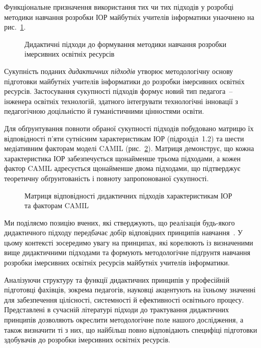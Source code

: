 Функціональне призначення використання тих чи тих підходів у розробці методики навчання розробки ІОР майбутніх учителів інформатики унаочнено на рис.~\ref{fig:2.1}.

\begin{figure}[!h]
\centering

\caption{Дидактичні підходи до формування методики навчання розробки імерсивних освітніх ресурсів}
\label{fig:2.1}
\end{figure}

Сукупність поданих \emph{дидактичних підходів} утворює методологічну основу підготовки майбутніх учителів інформатики до розробки імерсивних освітніх ресурсів. Застосування сукупності підходів формує новий тип педагога~-- інженера освітніх технологій, здатного інтегрувати технологічні інновації з педагогічною доцільністю й гуманістичними цінностями освіти.

Для обґрунтування повноти обраної сукупності підходів побудовано матрицю їх відповідності п'яти сутнісним характеристикам ІОР (підрозділ~1.2) та шести медіативним факторам моделі CAMIL (рис.~\ref{fig:approaches_matrix}). Матриця демонструє, що кожна характеристика ІОР забезпечується щонайменше трьома підходами, а кожен фактор CAMIL адресується щонайменше двома підходами, що підтверджує теоретичну обґрунтованість і повноту запропонованої сукупності.

\begin{figure}[!h]
\centering

\caption{Матриця відповідності дидактичних підходів характеристикам ІОР та факторам CAMIL}
\label{fig:approaches_matrix}
\end{figure}

Ми поділяємо позицію вчених, які стверджують, що реалізація будь-якого дидактичного підходу передбачає добір відповідних принципів навчання~\cite{Dychkivska2012Innovative}. У цьому контексті зосередимо увагу на принципах, які корелюють із визначеними вище дидактичними підходами та формують методологічне підґрунтя навчання розробки імерсивних освітніх ресурсів майбутніх учителів інформатики.

Аналізуючи структуру та функції дидактичних принципів у професійній підготовці фахівців, зокрема педагогів, науковці акцентують на їхньому значенні для забезпечення цілісності, системності й ефективності освітнього процесу. Представлені в сучасній літературі підходи до трактування дидактичних принципів дозволяють окреслити методологічне поле нашого дослідження, а також визначити ті з них, що найбільш повно відповідають специфіці підготовки здобувачів до розробки імерсивних освітніх ресурсів.

